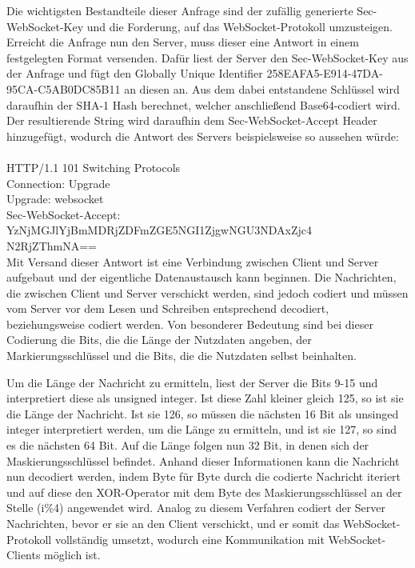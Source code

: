 \documentclass[12pt, onecolumn, notitlepage]{scrartcl}
\begin{document}
Die wichtigsten Bestandteile dieser Anfrage sind der zufällig generierte Sec-WebSocket-Key und die Forderung, auf das WebSocket-Protokoll umzusteigen. Erreicht die Anfrage nun den Server, muss dieser eine Antwort in einem festgelegten Format versenden. Dafür liest der Server den Sec-WebSocket-Key aus der Anfrage und fügt den Globally Unique Identifier 258EAFA5-E914-47DA-95CA-C5AB0DC85B11 an diesen an. Aus dem dabei entstandene Schlüssel wird daraufhin der SHA-1 Hash berechnet, welcher anschließend Base64-codiert wird.  Der resultierende String wird daraufhin dem Sec-WebSocket-Accept Header hinzugefügt, wodurch die Antwort des Servers beispielsweise so aussehen würde: \\ \\
HTTP/1.1 101 Switching Protocols \\
Connection: Upgrade \\
Upgrade: websocket \\
Sec-WebSocket-Accept: YzNjMGJlYjBmMDRjZDFmZGE5NGI1ZjgwNGU3NDAxZjc4\\N2RjZThmNA== \\

Mit Versand dieser Antwort ist eine Verbindung zwischen Client und Server aufgebaut und der eigentliche Datenaustausch kann beginnen. Die Nachrichten, die zwischen Client und Server verschickt werden, sind jedoch codiert und müssen vom Server vor dem Lesen und Schreiben entsprechend decodiert, beziehungsweise codiert werden. Von besonderer Bedeutung sind bei dieser Codierung die Bits, die die Länge der Nutzdaten angeben, der Markierungsschlüssel und die Bits, die die Nutzdaten selbst beinhalten. \par
Um die Länge der Nachricht zu ermitteln, liest der Server die Bits 9-15 und interpretiert diese als unsigned integer. Ist diese Zahl kleiner gleich 125, so ist sie die Länge der Nachricht. Ist sie 126, so müssen die nächsten 16 Bit als unsinged integer interpretiert werden, um die Länge zu ermitteln, und ist sie 127, so sind es die nächsten 64 Bit. Auf die Länge folgen nun 32 Bit, in denen sich der Maskierungsschlüssel befindet. Anhand dieser Informationen kann die Nachricht nun decodiert werden, indem Byte für Byte durch die codierte Nachricht iteriert und auf diese den XOR-Operator mit dem  Byte des Maskierungsschlüssel an der Stelle (i\%4) angewendet wird.  Analog zu diesem Verfahren codiert der Server Nachrichten, bevor er sie an den Client verschickt, und er somit das WebSocket-Protokoll vollständig umsetzt, wodurch eine Kommunikation mit WebSocket-Clients möglich ist.\\
\end{document}

